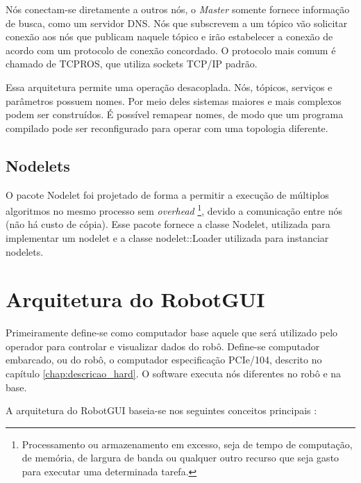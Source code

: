 Nós conectam-se diretamente a outros nós, o \textit{Master} somente fornece informação de busca, como um servidor DNS. Nós que subscrevem a um tópico vão solicitar conexão aos nós que publicam naquele tópico e irão estabelecer a conexão de acordo com um protocolo de conexão concordado. O protocolo mais comum é chamado de TCPROS, que utiliza sockets TCP/IP padrão.

Essa arquitetura permite uma operação desacoplada. Nós, tópicos, serviços e parâmetros possuem nomes. Por meio deles sistemas maiores e mais complexos podem ser construídos. É possível remapear nomes, de modo que um programa compilado  pode ser reconfigurado para operar com uma topologia diferente. 


\subsection{Nodelets}
O pacote Nodelet foi projetado de forma a permitir a execução de múltiplos algoritmos no mesmo processo sem \textit{overhead} \footnote{Processamento ou armazenamento em excesso, seja de tempo de computação, de memória, de largura de banda ou qualquer outro recurso que seja gasto para executar uma determinada tarefa.}, devido a comunicação entre nós (não há custo de cópia). Esse pacote fornece a classe Nodelet, utilizada para implementar um nodelet e a classe nodelet::Loader utilizada para instanciar nodelets. 

\section{Arquitetura do RobotGUI}

Primeiramente define-se como computador base aquele que será utilizado pelo operador para controlar e visualizar dados do robô. Define-se computador embarcado, ou do robô, o computador especificação PCIe/104, descrito no capítulo \ref{chap:descricao_hard}. O software executa nós diferentes no robô e na base.

A arquitetura do RobotGUI baseia-se nos seguintes conceitos principais \citep{nunes2013doris}:

